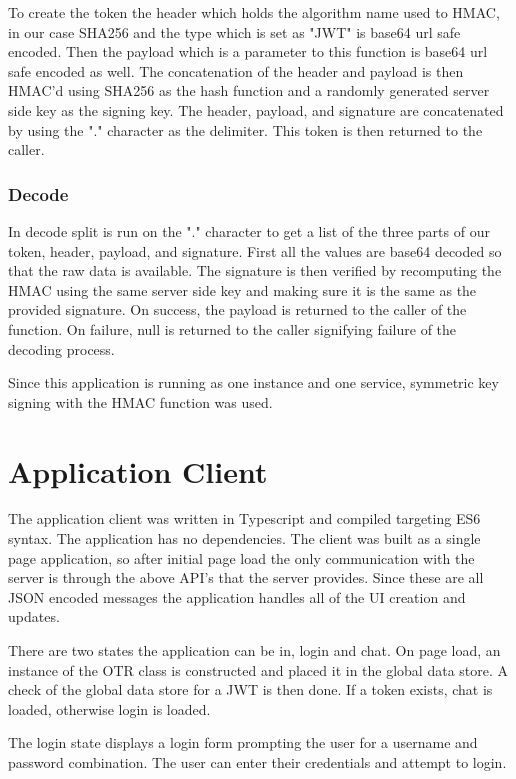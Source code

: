 To create the token the header which holds the algorithm name used to HMAC, in our case SHA256 and the type which is set as "JWT" is base64 url safe encoded. Then the payload which is a parameter to this function is base64 url safe encoded as well. The concatenation of the header and payload is then HMAC'd using SHA256 as the hash function and a randomly generated server side key as the signing key. The header, payload, and signature are concatenated by using the "." character as the delimiter. This token is then returned to the caller.


\subsubsection{Decode}


In decode split is run on the "." character to get a list of the three parts of our token, header, payload, and signature. First all the values are base64 decoded so that the raw data is available. The signature is then verified by recomputing the HMAC using the same server side key and making sure it is the same as the provided signature. On success, the payload is returned to the caller of the function. On failure, null is returned to the caller signifying failure of the decoding process.


Since this application is running as one instance and one service, symmetric key signing with the HMAC function was used. 


\section{Application Client}


The application client was written in Typescript and compiled targeting ES6 syntax. The application has no dependencies. The client was built as a single page application, so after initial page load the only communication with the server is through the above API's that the server provides. Since these are all JSON encoded messages the application handles all of the UI creation and updates.


There are two states the application can be in, login and chat. On page load, an instance of the OTR class is constructed and placed it in the global data store. A check of the global data store for a JWT is then done. If a token exists, chat is loaded, otherwise login is loaded.


The login state displays a login form prompting the user for a username and password combination. The user can enter their credentials and attempt to login. 


